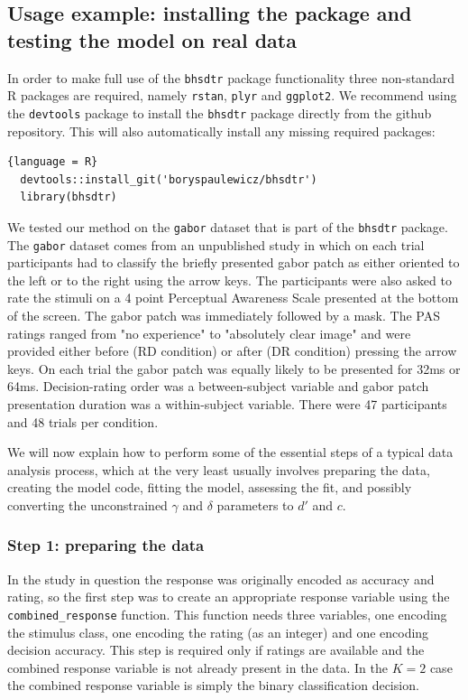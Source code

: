 \documentclass[oneside,a4paper]{article}
\begin{document}
\subsection{Usage example: installing the package and testing the
  model on real data}

In order to make full use of the \texttt{bhsdtr} package functionality
three non-standard R packages are required, namely \texttt{rstan},
\texttt{plyr} and \texttt{ggplot2}. We recommend using the
\texttt{devtools} package to install the \texttt{bhsdtr} package
directly from the github repository. This will also automatically
install any missing required packages:

\begin{lstlisting}{language = R}
  devtools::install_git('boryspaulewicz/bhsdtr')
  library(bhsdtr)
\end{lstlisting}

We tested our method on the \texttt{gabor} dataset that is part of the
\texttt{bhsdtr} package. The \texttt{gabor} dataset comes from an
unpublished study in which on each trial participants had to classify
the briefly presented gabor patch as either oriented to the left or to
the right using the arrow keys. The participants were also asked to
rate the stimuli on a 4 point Perceptual Awareness Scale
\cite{ramsoy2004introspection} presented at the bottom of the
screen. The gabor patch was immediately followed by a mask. The PAS
ratings ranged from "no experience" to "absolutely clear image" and
were provided either before (RD condition) or after (DR condition)
pressing the arrow keys. On each trial the gabor patch was equally
likely to be presented for 32ms or 64ms. Decision-rating order was a
between-subject variable and gabor patch presentation duration was a
within-subject variable. There were 47 participants and 48 trials per
condition.

We will now explain how to perform some of the essential steps of a
typical data analysis process, which at the very least usually
involves preparing the data, creating the model code, fitting the
model, assessing the fit, and possibly converting the unconstrained
$\gamma$ and $\delta$ parameters to $d'$ and $c$.

\subsubsection{Step 1: preparing the data}

In the study in question the response was originally encoded as
accuracy and rating, so the first step was to create an appropriate
response variable using the \texttt{combined\_response} function. This
function needs three variables, one encoding the stimulus class, one
encoding the rating (as an integer) and one encoding decision
accuracy. This step is required only if ratings are available and the
combined response variable is not already present in the data. In the
$K=2$ case the combined response variable is simply the binary
classification decision.
\end{document}

